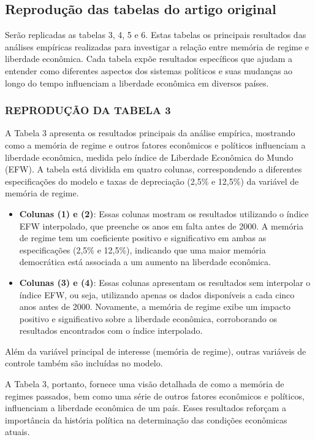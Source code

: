 \subsection{Reprodução das tabelas do artigo original}

Serão replicadas as tabelas 3, 4, 5 e 6. Estas tabelas os principais resultados das análises empíricas realizadas para investigar a relação entre memória de regime e liberdade econômica. Cada tabela expõe resultados específicos que ajudam a entender como diferentes aspectos dos sistemas políticos e suas mudanças ao longo do tempo influenciam a liberdade econômica em diversos países.

\subsubsection{REPRODUÇÃO DA TABELA 3}

A Tabela 3 apresenta os resultados principais da análise empírica, mostrando como a memória de regime e outros fatores econômicos e políticos influenciam a liberdade econômica, medida pelo índice de Liberdade Econômica do Mundo (EFW). A tabela está dividida em quatro colunas, correspondendo a diferentes especificações do modelo e taxas de depreciação (2,5\% e 12,5\%) da variável de memória de regime.

\begin{itemize}
    \item \textbf{Colunas (1) e (2)}: Essas colunas mostram os resultados utilizando o índice EFW interpolado, que preenche os anos em falta antes de 2000. A memória de regime tem um coeficiente positivo e significativo em ambas as especificações (2,5\% e 12,5\%), indicando que uma maior memória democrática está associada a um aumento na liberdade econômica.
    \item \textbf{Colunas (3) e (4)}: Essas colunas apresentam os resultados sem interpolar o índice EFW, ou seja, utilizando apenas os dados disponíveis a cada cinco anos antes de 2000. Novamente, a memória de regime exibe um impacto positivo e significativo sobre a liberdade econômica, corroborando os resultados encontrados com o índice interpolado.
\end{itemize}

Além da variável principal de interesse (memória de regime), outras variáveis de controle também são incluídas no modelo.

A Tabela 3, portanto, fornece uma visão detalhada de como a memória de regimes passados, bem como uma série de outros fatores econômicos e políticos, influenciam a liberdade econômica de um país. Esses resultados reforçam a importância da história política na determinação das condições econômicas atuais.


